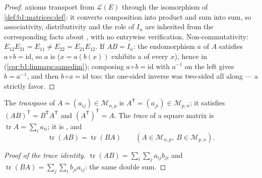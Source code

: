 \begin{proof}
 axioms transport from $\mathcal{L}(E)$ through the
isomorphism of \cref{def:b1:matrices:def}: it converts
composition into product and sum into sum, so associativity,
distributivity and the role of $I_n$ are inherited from the
corresponding facts about , with no entrywise verification.
Non-commutativity: $E_{12}E_{21} = E_{11} \neq E_{22}
= E_{21}E_{12}$. If $AB = I_n$: the endomorphism $a$ of $A$
satisfies $a \circ b = \mathrm{id}$, so $a$ is  ($x =
a(b(x))$ exhibits a  of every $x$), hence  in
 (\cref{cor:b1:linmaps:samedim}); composing $a
\circ b = \mathrm{id}$ with $a^{-1}$ on the left gives $b =
a^{-1}$, and then $b\circ a = \mathrm{id}$ too: the one-sided
inverse was two-sided all along --- a strictly
 favor.
\end{proof}

\begin{definition}\label{def:b1:matrices:transpose}
The \emph{transpose} of $A = (a_{ij}) \in \mathcal{M}_{n,p}$ is $A^{\mathsf T}
= (a_{ji}) \in \mathcal{M}_{p,n}$; it satisfies $(AB)^{\mathsf T} = B^{\mathsf T}
A^{\mathsf T}$ and $(A^{\mathsf T})^{\mathsf T} = A$. The
\emph{trace} of a square matrix is $\operatorname{tr} A
= \sum_i a_{ii}$; it is , and
\[
\operatorname{tr}(AB) = \operatorname{tr}(BA)
\qquad (A \in \mathcal{M}_{n,p},\ B \in \mathcal{M}_{p,n}).
\]
\end{definition}

\begin{proof}[Proof of the trace identity]
$\operatorname{tr}(AB) = \sum_i \sum_j a_{ij} b_{ji}$ and
$\operatorname{tr}(BA) = \sum_j \sum_i b_{ji} a_{ij}$: the same
double sum.
\end{proof}

